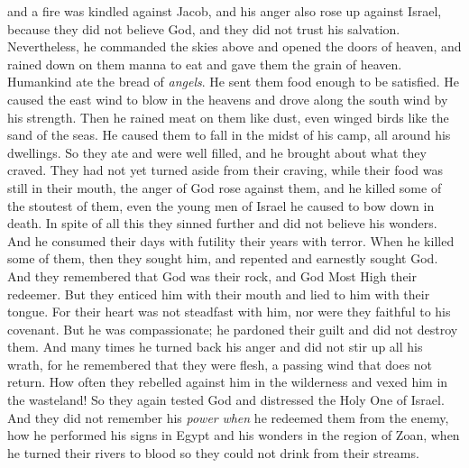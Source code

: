\begin{biblechapter}
{{{{{{and a fire was kindled against Jacob, 
and his anger also rose up against Israel,
\verse because they did not believe God, 
and they did not trust his salvation.
\verse Nevertheless, he commanded the skies above 
and opened the doors of heaven,
\verse and rained down on them manna to eat 
and gave them the grain of heaven.
\verse Humankind ate the bread of \textit{angels}. 
He sent them food enough to be satisfied.
\verse He caused the east wind to blow in the heavens 
and drove along the south wind by his strength.
\verse Then he rained meat on them like dust, 
even winged birds like the sand of the seas.
\verse He caused them to fall in the midst of his camp, 
all around his dwellings.
\verse So they ate and were well filled, 
and he brought about what they craved.
\verse They had not yet turned aside from their craving, 
while their food was still in their mouth,
\verse the anger of God rose against them, 
and he killed some of the stoutest of them, 
even the young men of Israel he caused to bow down in death.
\verse In spite of all this they sinned further 
and did not believe his wonders.
\verse And he consumed their days with futility  
their years with terror.
\verse When he killed some of them, then they sought him, 
and repented and earnestly sought God.
\verse And they remembered that God was their rock, 
and God Most High their redeemer.
\verse But they enticed him with their mouth 
and lied to him with their tongue.
\verse For their heart was not steadfast with him, 
nor were they faithful to his covenant.
\verse But he was compassionate; he pardoned their guilt 
and did not destroy them. 
And many times he turned back his anger 
and did not stir up all his wrath,
\verse for he remembered that they were flesh, 
a passing wind that does not return.
\verse How often they rebelled against him in the wilderness 
and vexed him in the wasteland!
\verse So they again tested God 
and distressed the Holy One of Israel.
\verse And they did not remember his \textit{power} 
\textit{when} he redeemed them from the enemy,
\verse how he performed his signs in Egypt 
and his wonders in the region of Zoan,
\verse when he turned their rivers to blood 
so they could not drink from their streams.
}}}}}}
\end{biblechapter}
